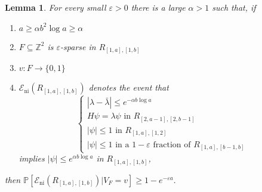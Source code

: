 \documentclass{amsart}
\newtheorem{lemma}[equation]{Lemma}
\numberwithin{equation}{section}
\numberwithin{figure}{section}
\newcommand{\Z}{\mathbb{Z}}
\renewcommand{\P}{\mathbb{P}}
\newcommand{\ep}{\varepsilon}
\begin{document}
\begin{lemma}
\label{l.nice}
For every small $\ep > 0$ there is a large $\alpha > 1$ such that, if
\begin{enumerate}
\item $a \geq \alpha b^2 \log a \geq \alpha$
\item $F \subseteq \Z^2$ is $\ep$-sparse in $R_{[1,a],[1,b]}$
\item $v : F \to \{ 0, 1 \}$
\item $\mathcal E_{\mathrm{ni}}(R_{[1,a],[1,b]})$ denotes the event that
\begin{equation*}
\begin{cases}
|\lambda - \bar \lambda| \leq e^{- \alpha b \log a} \\
H \psi = \lambda \psi \mbox{ in } R_{[2,a-1],[2,b-1]} \\
|\psi| \leq 1 \mbox{ in } R_{[1,a],[1,2]} \\
|\psi| \leq 1 \mbox{ in a $1-\ep$ fraction of } R_{[1,a],[b-1,b]}
\end{cases}
\end{equation*}
implies $|\psi| \leq e^{\alpha b \log a}$ in $R_{[1,a],[1,b]}$,
\end{enumerate}
then $\P[\mathcal E_{\mathrm{ni}}(R_{[1,a],[1,b]}) | V_F = v] \geq 1 - e^{- \ep a}.$
\end{lemma}
\end{document}
